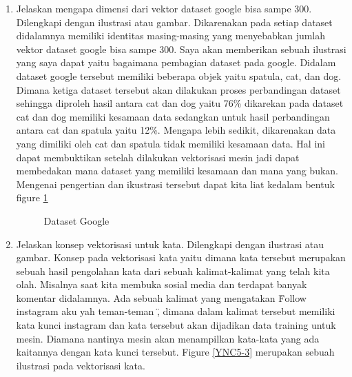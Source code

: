\begin{enumerate}
\item Jelaskan mengapa dimensi dari vektor dataset google bisa sampe 300. Dilengkapi dengan ilustrasi atau gambar.
	\subitem Dikarenakan pada setiap dataset didalamnya memiliki identitas masing-masing yang menyebabkan jumlah vektor dataset google bisa sampe 300. Saya akan memberikan sebuah ilustrasi yang saya dapat yaitu bagaimana pembagian dataset pada google. Didalam dataset google tersebut memiliki beberapa objek yaitu spatula, cat, dan dog. Dimana ketiga dataset tersebut akan dilakukan proses perbandingan dataset sehingga diproleh hasil antara cat dan dog yaitu 76\% dikarekan pada dataset cat dan dog memiliki kesamaan data sedangkan untuk hasil perbandingan antara cat dan spatula yaitu 12\%. Mengapa lebih sedikit, dikarenakan data yang dimiliki oleh cat dan spatula tidak memiliki kesamaan data. Hal ini dapat membuktikan setelah dilakukan vektorisasi mesin jadi dapat membedakan mana dataset yang memiliki kesamaan dan mana yang bukan. Mengenai pengertian dan ikustrasi tersebut dapat kita liat kedalam bentuk figure \ref{YNC5-5}

	\begin{figure}[!htbp]
		\caption{Dataset Google}
		\label{YNC5-5}
	\end{figure}

\item Jelaskan konsep vektorisasi untuk kata. Dilengkapi dengan ilustrasi atau gambar.
	\subitem Konsep pada vektorisasi kata yaitu dimana kata tersebut merupakan sebuah hasil pengolahan kata dari sebuah kalimat-kalimat yang telah kita olah. Misalnya saat kita membuka sosial media dan terdapat banyak komentar didalamnya. Ada sebuah kalimat yang mengatakan \" Follow instagram aku yah teman-teman \" , dimana dalam kalimat tersebut memiliki kata kunci instagram dan kata tersebut akan dijadikan data training untuk mesin. Diamana nantinya mesin akan menampilkan kata-kata yang ada kaitannya dengan kata kunci tersebut. Figure \ref{YNC5-3} merupakan sebuah ilustrasi pada vektorisasi kata.


\end{enumerate}
